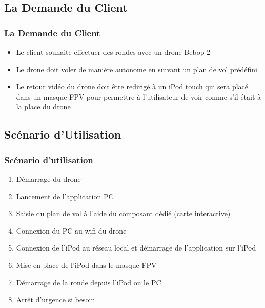 \documentclass{beamer}
\begin{document}
	\begin{frame}
		\section{La Demande du Client}
		\begin{center}
		\frametitle{La Demande du Client}
		\begin{itemize}
		    \item Le client souhaite effectuer des rondes avec un drone Bebop 2\\
		    \item Le drone doit voler de manière autonome en suivant un plan de vol prédéfini \\
		    \item Le retour vidéo du drone doit être redirigé à un iPod touch qui sera placé dans un masque FPV pour permettre à l'utilisateur de voir comme s'il était à la place du drone\\
		\end{itemize}
		   
		\end{center}
	\end{frame}
	\begin{frame}
		\section{Scénario d'Utilisation}
		\begin{center}
		\frametitle{Scénario d'utilisation}
		\begin{enumerate}
		    \item Démarrage du drone\\
		    \item Lancement de l'application PC\\
		    \item Saisie du plan de vol à l'aide du composant dédié (carte interactive)\\
		    \item Connexion du PC au wifi du drone
		    \item Connexion de l'iPod au réseau local et démarrage de l'application sur l'iPod
		    \item Mise en place de l'iPod dans le masque FPV
		    \item Démarrage de la ronde depuis l'iPod ou le PC
		    \item Arrêt d'urgence si besoin
		\end{enumerate}
		   
		\end{center}
	\end{frame}
	
\end{document}
